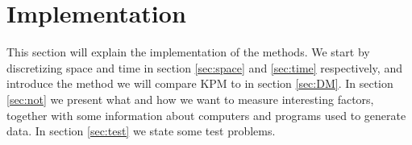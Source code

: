 \chapter{Implementation}%
\label{sec:imp}
This section will explain the implementation of the methods. We start by discretizing space and time in section \ref{sec:space} and \ref{sec:time} respectively, and introduce the method we will compare KPM to in section \ref{sec:DM}. 
In section \ref{sec:not} we present what and how we want to measure interesting factors, together with some information about computers and programs used to generate data.
In section \ref{sec:test} we state some test problems.


